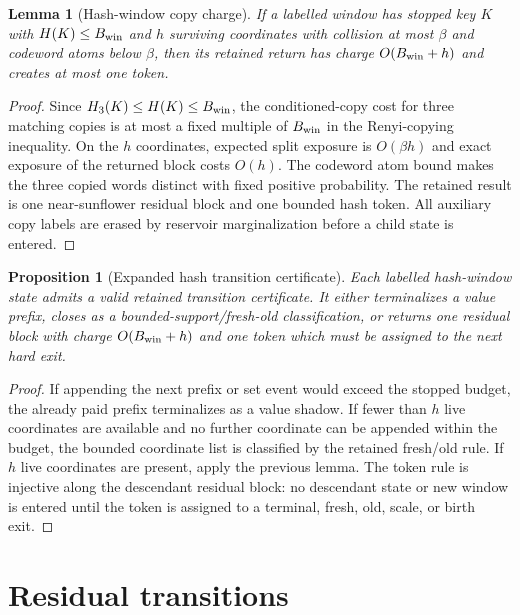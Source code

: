 \documentclass[11pt]{article}
\newtheorem{lemma}[theorem]{Lemma}
\newtheorem{proposition}[theorem]{Proposition}
\theoremstyle{remark}
\begin{document}
\begin{lemma}[Hash-window copy charge]\label{lem:app-hash-copy-charge}
If a labelled window has stopped key $K$ with $H(K)\le B_{\rm win}$ and $h$ surviving coordinates with collision at most $\beta$ and codeword atoms below $\beta$, then its retained return has charge $O(B_{\rm win}+h)$ and creates at most one token.
\end{lemma}

\begin{proof}
Since $H_3(K)\le H(K)\le B_{\rm win}$, the conditioned-copy cost for three matching copies is at most a fixed multiple of $B_{\rm win}$ in the Renyi-copying inequality.  On the $h$ coordinates, expected split exposure is $O(\beta h)$ and exact exposure of the returned block costs $O(h)$.  The codeword atom bound makes the three copied words distinct with fixed positive probability.  The retained result is one near-sunflower residual block and one bounded hash token.  All auxiliary copy labels are erased by reservoir marginalization before a child state is entered.
\end{proof}

\begin{proposition}[Expanded hash transition certificate]\label{prop:app-hash-certificate}
Each labelled hash-window state admits a valid retained transition certificate.  It either terminalizes a value prefix, closes as a bounded-support/fresh-old classification, or returns one residual block with charge $O(B_{\rm win}+h)$ and one token which must be assigned to the next hard exit.
\end{proposition}

\begin{proof}
If appending the next prefix or set event would exceed the stopped budget, the already paid prefix terminalizes as a value shadow.  If fewer than $h$ live coordinates are available and no further coordinate can be appended within the budget, the bounded coordinate list is classified by the retained fresh/old rule.  If $h$ live coordinates are present, apply the previous lemma.  The token rule is injective along the descendant residual block: no descendant state or new window is entered until the token is assigned to a terminal, fresh, old, scale, or birth exit.
\end{proof}

\section{Residual transitions}\label{app:residual}
\end{document}
